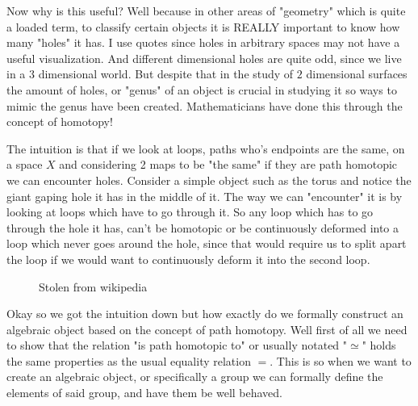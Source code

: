 \documentclass[paper=a4,fontsize=paper,12.5pt]{book}
\newcommand{\3}{\vspace*{3mm}}
\begin{document}
Now why is this useful? Well because in other areas of "geometry" which is quite a loaded term, to classify certain objects it is REALLY important to know how many "holes" it has. I use quotes since holes in arbitrary spaces may not have a useful visualization. And different dimensional holes are quite odd, since we live in a $3$ dimensional world. But despite that in the study of $2$ dimensional surfaces the amount of holes, or "genus" of an object is crucial in studying it so ways to mimic the genus have been created. Mathematicians have done this through the concept of homotopy! 


\newpage

The intuition is that if we look at loops, paths who's endpoints are the same, on a space $X$ and considering 2 maps to be "the same" if they are path homotopic we can encounter holes. Consider a simple object such as the torus and notice the giant gaping hole it has in the middle of it. The way we can "encounter" it is by looking at loops which have to go through it. So any loop which has to go through the hole it has, can't be homotopic or be continuously deformed into a loop which never goes around the hole, since that would require us to split apart the loop if we would want to continuously deform it into the second loop.
\3


{
 \begin{figure}[!hbt]
 \begin{center}
 \begin{minipage}{0.85\textwidth}
 \caption{\label{torus}\small{Stolen from wikipedia}}
 \end{minipage}
 \end{center}
 \end{figure}
 }

\3

Okay so we got the intuition down but how exactly do we formally construct an algebraic object based on the concept of path homotopy. Well first of all we need to show that the relation "is path homotopic to" or usually notated "$\simeq$" holds the same properties as the usual equality relation $=$. This is so when we want to create an algebraic object, or specifically a group we can formally define the elements of said group, and have them be well behaved.
\end{document}
